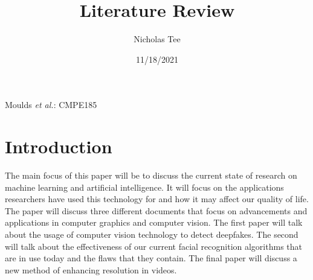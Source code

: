 \documentclass[12pt,journal,compsoc]{IEEEtran}
\begin{document}
\title{Literature Review}
\author{Nicholas Tee}

\date{11/18/2021}

%
{Moulds \MakeLowercase{\textit{et al.}}: CMPE185}



\maketitle



\section{Introduction}
The main focus of this paper will be to discuss the current state of research on machine learning and artificial intelligence. It will focus on the applications researchers have used this technology for and how it may affect our quality of life. The paper will discuss three different documents that focus on advancements and applications in computer graphics and computer vision. The first paper will talk about the usage of computer vision technology to detect deepfakes. The second will talk about the effectiveness of our current facial recognition algorithms that are in use today and the flaws that they contain. The final paper will discuss a new method of enhancing resolution in videos.
\end{document}
